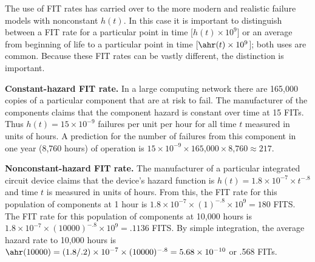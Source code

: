 The use of FIT rates has carried over to the more modern and realistic
failure models with nonconstant $h(t)$. In this case it is important
to distinguish between a FIT rate for a particular point in time
[$h(t) \times 10^{9}$] or an average from beginning of life to a
particular point in time [$\ahr(t) \times 10^{9}$]; both uses are
common. Because these FIT rates can be vastly different, the
distinction is important.

\begin{example}
{\bf Constant-hazard FIT rate.}
In a large computing network there are 165,000 copies of a particular
component that are at risk to fail. The manufacturer of the components
claims that the component hazard is constant over time at 15 FITs.
Thus $h(t)=15 \times 10^{-9}$ failures per unit per hour
for all time $t$ measured in units
of hours.  A prediction for the
number of failures from this component in one year (8,760 hours) of
operation is $15 \times 10^{-9} \times \mbox{165,000} \times
\mbox{8,760} \approx 217$.
\end{example}

\begin{example}
{\bf Nonconstant-hazard FIT rate.}
The manufacturer of a particular integrated circuit device claims that
the device's hazard function is $h(t)= 1.8\times 10^{-7} \times t^{-.8}$
and time $t$ is measured in units
of hours.
From this, the FIT rate for this population of components at 1 hour is $1.8 
\times 10^{-7} \times (1)^{-.8}
\times 10^{9} = 180 $ FITS.
The FIT rate for this population of
components at 10,000 hours is $1.8 \times 10^{-7}
\times (10000)^{-.8}
\times 10^{9} = .1136 $ FITS.
By simple integration, the average hazard rate to 10,000 hours is
$\ahr(10000)= (1.8/.2) \times 10^{-7}
\times (10000)^{-.8} = 5.68 \times 10^{-10}$ or .568 FITs.
\end{example}

